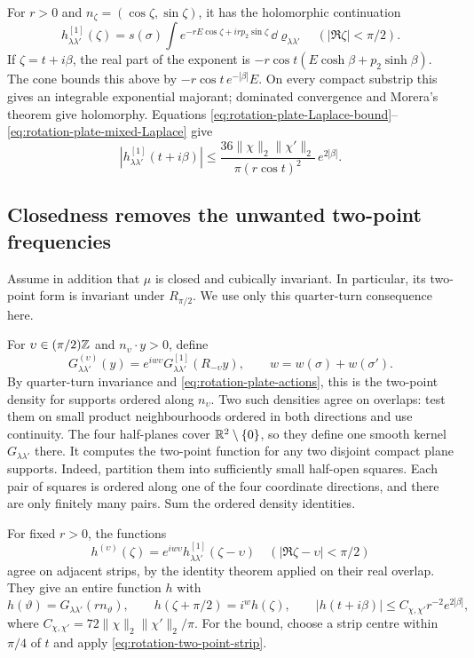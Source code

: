 For $r>0$ and $n_\zeta=(\cos\zeta,\sin\zeta)$, it has the
holomorphic continuation
\[
 h^{[1]}_{\lambda\lambda'}(\zeta)
   =s(\sigma)\int
       e^{-rE\cos\zeta+irp_2\sin\zeta}\,
                                \dd\varrho_{\lambda\lambda'}
       \quad(|\Re\zeta|<\pi/2).
\]
If $\zeta=t+i\beta$, the real part of the exponent is
$-r\cos t(E\cosh\beta+p_2\sinh\beta)$.
The cone bounds this above by
$-r\cos t\,e^{-|\beta|}E$.
On every compact substrip this gives an integrable exponential
majorant; dominated convergence and Morera's theorem give
holomorphy. Equations
\eqref{eq:rotation-plate-Laplace-bound}--\eqref{eq:rotation-plate-mixed-Laplace}
give
\begin{equation}\label{eq:rotation-two-point-strip}
 |h^{[1]}_{\lambda\lambda'}(t+i\beta)|
 \le\frac{36\|\chi\|_2\|\chi'\|_2}
          {\pi(r\cos t)^2}\,e^{2|\beta|}.
\end{equation}

\subsection{Closedness removes the unwanted two-point frequencies}
\label{subsec:rotation-two-point-frequencies}

Assume in addition that $\mu$ is closed and cubically invariant.
In particular, its two-point form is invariant under
$R_{\pi/2}$. We use only this quarter-turn consequence here.

For $\upsilon\in(\pi/2)\mathbb Z$ and $n_\upsilon\cdot y>0$, define
\[
 G^{(\upsilon)}_{\lambda\lambda'}(y)
   =e^{iw\upsilon}
       G^{[1]}_{\lambda\lambda'}(R_{-\upsilon}y),
       \qquad w=w(\sigma)+w(\sigma').
\]
By quarter-turn invariance and
\eqref{eq:rotation-plate-actions}, this is the two-point density
for supports ordered along $n_\upsilon$.
Two such densities agree on overlaps: test them on small product
neighbourhoods ordered in both directions and use continuity.
The four half-planes cover $\mathbb R^2\setminus\{0\}$, so they define
one smooth kernel $G_{\lambda\lambda'}$ there.
It computes the two-point function for any two disjoint compact
plane supports. Indeed, partition them into sufficiently small
half-open squares. Each pair of squares is ordered along one of
the four coordinate directions, and there are only finitely many
pairs. Sum the ordered density identities.

For fixed $r>0$, the functions
\[
 h^{(\upsilon)}(\zeta)=e^{iw\upsilon}
       h^{[1]}_{\lambda\lambda'}(\zeta-\upsilon)
       \quad(|\Re\zeta-\upsilon|<\pi/2)
\]
agree on adjacent strips, by the identity theorem applied on
their real overlap. They give an entire function $h$ with
\begin{equation}\label{eq:rotation-two-point-entire-angle}
 h(\vartheta)=G_{\lambda\lambda'}(rn_\vartheta),\qquad
 h(\zeta+\pi/2)=i^w h(\zeta),\qquad
 |h(t+i\beta)|\le C_{\chi,\chi'}r^{-2}e^{2|\beta|},
\end{equation}
where $C_{\chi,\chi'}=72\|\chi\|_2\|\chi'\|_2/\pi$.
For the bound, choose a strip centre within $\pi/4$ of $t$ and
apply \eqref{eq:rotation-two-point-strip}.

